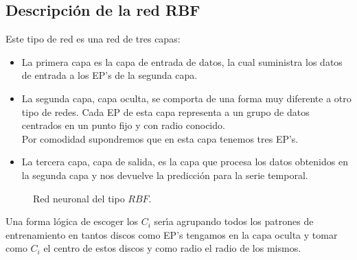 %
% 

\subsection{Descripci\'on de la red RBF}

Este tipo de red es una red de tres capas:
\begin{itemize}
\item La primera capa es la capa de entrada de datos, la cual suministra los
datos de entrada a los EP's de la segunda capa. 
\item La segunda capa, capa oculta, se comporta de una forma muy diferente a
otro tipo de redes. Cada EP de esta capa representa a un grupo de datos
centrados en un punto fijo y con radio conocido.\\

Por comodidad supondremos que en esta capa tenemos tres EP's.
\item La tercera capa, capa de salida, es la capa que procesa los datos
obtenidos en la segunda capa y nos devuelve la predicci\'on para la serie
temporal.\\
\end{itemize}
\begin{figure}[!h]

\caption{Red neuronal del tipo $RBF$.}
\end{figure}

Una forma l\'ogica de escoger los $C_i$ ser\'{\i}a agrupando todos los patrones
de entrenamiento en tantos discos como EP's tengamos en la capa oculta y tomar
como $C_i$ el centro de estos discos y como radio el radio de los mismos.
